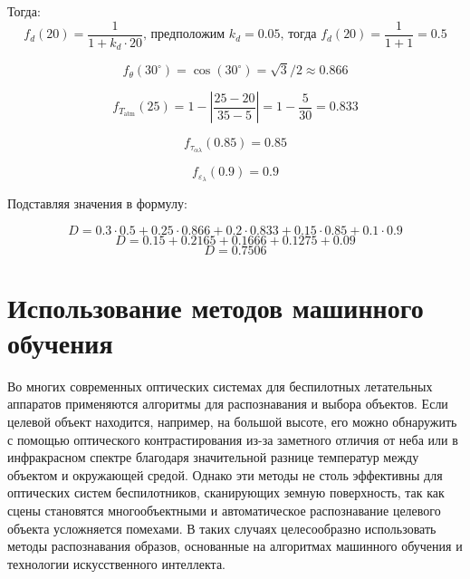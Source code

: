 Тогда:
\[f_d(20) = \frac{1}{1 + k_d \cdot 20} \text{, предположим } k_d = 0.05 \text{, тогда } f_d(20) = \frac{1}{1 + 1} = 0.5 \]

\[f_\theta(30^\circ) = \cos(30^\circ) = \sqrt{3}/2 \approx 0.866\] 

\[f_{T_{\text{atm}}}(25) = 1 - \left| \frac{25 - 20}{35 - 5} \right| = 1 - \frac{5}{30} = 0.833\]

\[f_{\tau_{\alpha \lambda}}(0.85) = 0.85\] 

\[f_{\varepsilon_\lambda}(0.9) = 0.9\] 

Подставляя значения в формулу:

\[ D = 0.3 \cdot 0.5 + 0.25 \cdot 0.866 + 0.2 \cdot 0.833 + 0.15 \cdot 0.85 + 0.1 \cdot 0.9 \]
\[ D = 0.15 + 0.2165 + 0.1666 + 0.1275 + 0.09 \]
\[ D = 0.7506 \]

\section{Использование методов машинного обучения}

Во многих современных оптических системах для беспилотных летательных аппаратов применяются алгоритмы для распознавания и выбора объектов. Если целевой объект находится, например, на большой высоте, его можно обнаружить с помощью оптического контрастирования из-за заметного отличия от неба или в инфракрасном спектре благодаря значительной разнице температур между объектом и окружающей средой. Однако эти методы не столь эффективны для оптических систем беспилотников, сканирующих земную поверхность, так как сцены становятся многообъектными и автоматическое распознавание целевого объекта усложняется помехами. В таких случаях целесообразно использовать методы распознавания образов, основанные на алгоритмах машинного обучения и технологии искусственного интеллекта.

